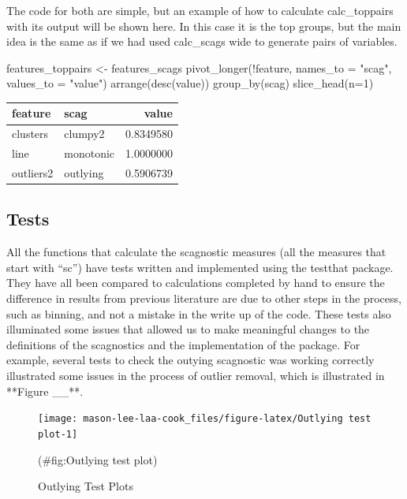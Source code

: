 The code for both are simple, but an example of how to calculate
calc\_toppairs with its output will be shown here. In this case it is
the top groups, but the main idea is the same as if we had used
calc\_scags wide to generate pairs of variables.

\begin{Schunk}
\begin{Sinput}
features_toppairs <- features_scags %
  pivot_longer(!feature, names_to = "scag", values_to = "value") %
  arrange(desc(value)) %
  group_by(scag) %
  slice_head(n=1)
\end{Sinput}
\end{Schunk}

\begin{Schunk}

\begin{tabular}{l|l|r}
\hline
feature & scag & value\\
\hline
clusters & clumpy2 & 0.8349580\\
\hline
line & monotonic & 1.0000000\\
\hline
outliers2 & outlying & 0.5906739\\
\hline
\end{tabular}

\end{Schunk}

\hypertarget{tests}{%
\subsection{Tests}\label{tests}}

All the functions that calculate the scagnostic measures (all the
measures that start with ``sc'') have tests written and implemented
using the testthat package. They have all been compared to calculations
completed by hand to ensure the difference in results from previous
literature are due to other steps in the process, such as binning, and
not a mistake in the write up of the code. These tests also illuminated
some issues that allowed us to make meaningful changes to the
definitions of the scagnostics and the implementation of the package.
For example, several tests to check the outying scagnostic was working
correctly illustrated some issues in the process of outlier removal,
which is illustrated in **Figure \_\_**.

\begin{Schunk}
\begin{figure}
\texttt{[image: mason-lee-laa-cook\_files/figure-latex/Outlying test plot-1]} \caption[Outlying Test Plots]{Outlying Test Plots}(\#fig:Outlying test plot)
\end{figure}
\end{Schunk}

